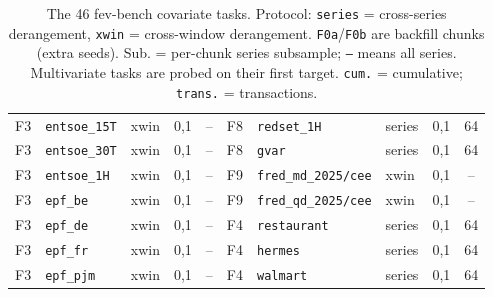 \begin{table}[t]
\begin{tabular}{@{}llllc@{\hspace{1.2em}}llllc@{}}
F3 & \texttt{entsoe\_15T} & xwin & 0,1 & -- & F8 & \texttt{redset\_1H} & series & 0,1 & 64 \\
F3 & \texttt{entsoe\_30T} & xwin & 0,1 & -- & F8 & \texttt{gvar} & series & 0,1 & 64 \\
F3 & \texttt{entsoe\_1H} & xwin & 0,1 & -- & F9 & \texttt{fred\_md\_2025/cee} & xwin & 0,1 & -- \\
F3 & \texttt{epf\_be} & xwin & 0,1 & -- & F9 & \texttt{fred\_qd\_2025/cee} & xwin & 0,1 & -- \\
F3 & \texttt{epf\_de} & xwin & 0,1 & -- & F4 & \texttt{restaurant} & series & 0,1 & 64 \\
F3 & \texttt{epf\_fr} & xwin & 0,1 & -- & F4 & \texttt{hermes} & series & 0,1 & 64 \\
F3 & \texttt{epf\_pjm} & xwin & 0,1 & -- & F4 & \texttt{walmart} & series & 0,1 & 64 \\
\bottomrule
\end{tabular}
\caption{The 46 fev-bench covariate tasks. Protocol: \texttt{series} = cross-series
derangement, \texttt{xwin} = cross-window derangement. \texttt{F0a}/\texttt{F0b} are
backfill chunks (extra seeds). Sub. = per-chunk series subsample; \texttt{--} means all
series. Multivariate tasks are probed on their first target. \texttt{cum.} =
cumulative; \texttt{trans.} = transactions.}
\label{tab:inventory}
\end{table}
